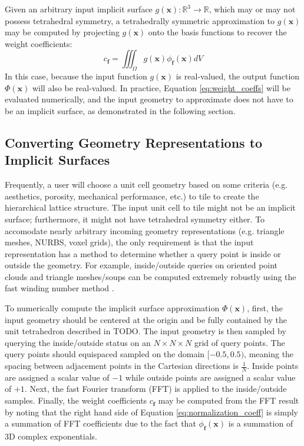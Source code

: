 \documentclass[acmtog]{acmart}
\begin{document}
Given an arbitrary input implicit surface $g(\mathbf{x}): \mathbb{R}^3 \rightarrow \mathbb{R}$, which may or may not possess tetrahedral symmetry, a tetrahedrally symmetric approximation to $g(\mathbf{x})$ may be computed by projecting $g(\mathbf{x})$ onto the basis functions to recover the weight coefficients:
%
\begin{equation}
  \label{eq:weight_coeffs}
  c_{\mathbf{f}} = \iiint_{\Omega} g(\mathbf{x}) \phi_{\mathbf{f}}(\mathbf{x}) dV
\end{equation}
%
In this case, because the input function $g(\mathbf{x})$ is real-valued, the output function $\Phi(\mathbf{x})$ will also be real-valued. In practice, Equation \ref{eq:weight_coeffs} will be evaluated numerically, and the input geometry to approximate does not have to be an implicit surface, as demonstrated in the following section.

\subsection{Converting Geometry Representations to Implicit Surfaces}

Frequently, a user will choose a unit cell geometry based on some criteria (e.g. aesthetics, porosity, mechanical performance, etc.) to tile to create the hierarchical lattice structure. The input unit cell to tile might not be an implicit surface; furthermore, it might not have tetrahedral symmetry either. To accomodate nearly arbitrary incoming geometry representations (e.g. triangle meshes, NURBS, voxel grids), the only requirement is that the input representation has a method to determine whether a query point is inside or outside the geometry. For example, inside/outside queries on oriented point clouds and triangle meshes/soups can be computed extremely robustly using the fast winding number method \cite{barill2018fast}.

To numerically compute the implicit surface approximation $\Phi(\mathbf{x})$, first, the input geometry should be centered at the origin and be fully contained by the unit tetrahedron described in TODO. The input geometry is then sampled by querying the inside/outside status on an $N \times N \times N$ grid of query points. The query points should equispaced sampled on the domain $[-0.5, 0.5)$, meaning the spacing between adjacement points in the Cartesian directions is $\frac{1}{N}$. Inside points are assigned a scalar value of $-1$ while outside points are assigned a scalar value of $+1$. Next, the fast Fourier transform (FFT) is applied to the inside/outside samples. Finally, the weight coefficients $c_{\mathbf{f}}$ may be computed from the FFT result by noting that the right hand side of Equation \ref{eq:normalization_coeff} is simply a summation of FFT coefficients due to the fact that $\phi_{\mathbf{f}}(\mathbf{x})$ is a summation of 3D complex exponentials.
\end{document}
